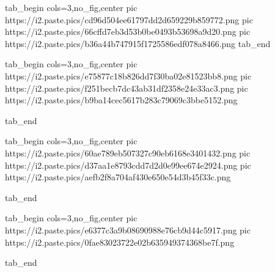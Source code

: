  
 
 
 
 
\zzSecCmtScr


\ifcmt
  tab_begin cols=3,no_fig,center
     pic https://i2.paste.pics/cd96d504ee61797dd2d659229b859772.png
		 pic https://i2.paste.pics/66cffd7eb3d53b0be0493b53698a9d20.png
		 pic https://i2.paste.pics/b36a44b747915f1725586edf078a8466.png
  tab_end
\fi

\ifcmt
  tab_begin cols=3,no_fig,center
	pic https://i2.paste.pics/e75877c18b826dd7f30ba02e81523bb8.png
	pic https://i2.paste.pics/f251becb7dc43ab31df2358e24e33ac3.png
	pic https://i2.paste.pics/b9ba14cec5617b283c79069c3bbe5152.png

  tab_end
\fi

\ifcmt
  tab_begin cols=3,no_fig,center
	pic https://i2.paste.pics/60ae789eb507327c90eb6168e3401432.png
	pic https://i2.paste.pics/d37aa1e8793cdd7d2d0e99ee674e2924.png
	pic https://i2.paste.pics/aefb2f8a704af430e650e54d3b45f33c.png

  tab_end
\fi

\ifcmt
  tab_begin cols=3,no_fig,center
	pic https://i2.paste.pics/e6377c3a9b08690988e76cb9d44c5917.png
	pic https://i2.paste.pics/0fae83023722e02b635949374368be7f.png

  tab_end
\fi
